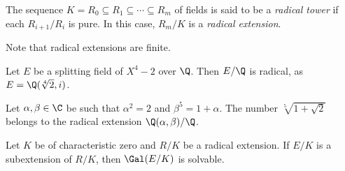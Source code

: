 \begin{definition}
    The sequence $K=R_0\subseteq R_1\subseteq\cdots\subseteq R_m$ 
    of fields is said to be a \emph{radical tower} if 
    each $R_{i+1}/R_i$ is pure. In this case, $R_m/K$ is a \emph{radical extension}. 
\end{definition}

Note that radical extensions are finite. 

\begin{example}
    Let $E$ be a splitting field of $X^4-2$ over $\Q$. Then $E/\Q$ is radical, 
    as $E=\Q(\sqrt[4]{2},i)$. 
\end{example}

\begin{example}
    Let $\alpha,\beta\in\C$ be such that $\alpha^2=2$ and 
    $\beta^5=1+\alpha$. 
    The number $\sqrt[5]{1+\sqrt{2}}$ belongs to the radical extension $\Q(\alpha,\beta)/\Q$. 
\end{example}

\begin{theorem}
\label{thm:by_radicals}
    Let $K$ be of characteristic zero and 
    $R/K$ be a radical extension. If $E/K$ is a subextension of $R/K$, 
    then $\Gal(E/K)$ is solvable. 
\end{theorem}

